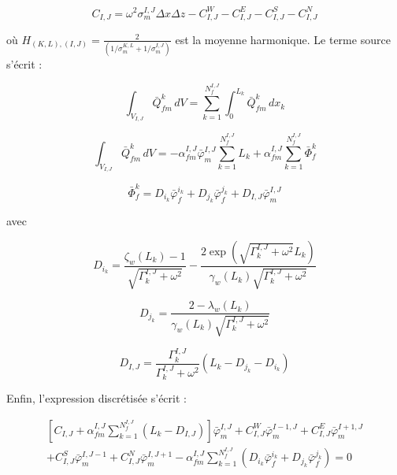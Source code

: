 \begin{equation}
C_{I,J}=\omega^2\sigma_m^{I,J}\Delta x\Delta z-C_{I,J}^W-C_{I,J}^E-C_{I,J}^S-C_{I,J}^N
\end{equation}

où $H_{(K,L),(I,J)}=\frac{2}{\left(1/\sigma_m^{K,L}+1/\sigma_m^{I,J}\right)}$ est la moyenne harmonique. Le terme source s'écrit :

\begin{equation}
\int_{V_{I,J}} \bar{Q}_{fm}^k\,dV=\sum_{k=1}^{N_f^{I,J}}\int_0^{L_k}\bar{Q}_{fm}^k\,dx_k
\end{equation}

\begin{equation}
\int_{V_{I,J}} \bar{Q}_{fm}^k\,dV=-\alpha_{fm}^{I,J}\bar{\varphi}_m^{I,J}\sum_{k=1}^{N_f^{I,J}}L_k+\alpha_{fm}^{I,J}\sum_{k=1}^{N_f^{I,J}}\bar{\Phi}_f^k
\end{equation}

\begin{equation}
\bar{\Phi}_f^k=D_{i_k}\bar{\varphi}_f^{i_k}+D_{j_k}\bar{\varphi}_f^{j_k}+D_{I,J}\bar{\varphi}_m^{I,J}
\end{equation}

avec

\begin{equation}
D_{i_k}=\frac{\zeta_w(L_k)-1}{\sqrt{\Gamma_k^{I,J}+\omega^2}}-\frac{2\exp\left(\sqrt{\Gamma_k^{I,J}+\omega^2}L_k\right)}{\gamma_w(L_k)\sqrt{\Gamma_k^{I,J}+\omega^2}}
\end{equation}

\begin{equation}
D_{j_k}=\frac{2-\lambda_w(L_k)}{\gamma_w(L_k)\sqrt{\Gamma_k^{I,J}+\omega^2}}
\end{equation}

\begin{equation}
D_{I,J}=\frac{\Gamma_k^{I,J}}{\Gamma_k^{I,J}+\omega^2}\left(L_k-D_{j_k}-D_{i_k}\right)
\end{equation}

Enfin, l'expression discrétisée s'écrit :

\begin{equation}
\begin{split}
\left[C_{I,J}+\alpha_{fm}^{I,J}\sum_{k=1}^{N_f^{I,J}}(L_k-D_{I,J})\right]\bar{\varphi}_m^{I,J}+C_{I,J}^W\bar{\varphi}_m^{I-1,J}+C_{I,J}^E\bar{\varphi}_m^{I+1,J} \\
+C_{I,J}^S\bar{\varphi}_m^{I,J-1}+C_{I,J}^N\bar{\varphi}_m^{I,J+1}-\alpha_{fm}^{I,J}\sum_{k=1}^{N_f^{I,J}}\left(D_{i_k}\bar{\varphi}_f^{i_k}+D_{j_k}\bar{\varphi}_f^{j_k}\right)=0
\end{split}
\end{equation}

